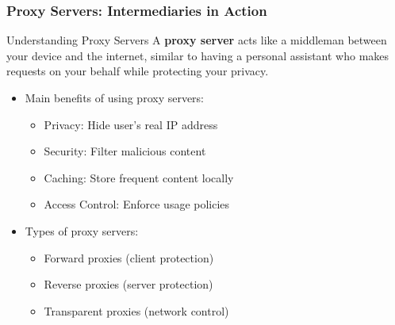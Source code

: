 \documentclass{beamer}
\begin{document}
\begin{frame}
    \frametitle{Proxy Servers: Intermediaries in Action}
    
    \begin{block}{Understanding Proxy Servers}
        A \textbf{proxy server} acts like a middleman between your device and the internet, similar to having a personal assistant who makes requests on your behalf while protecting your privacy.
    \end{block}
    
    \begin{itemize}
        \item Main benefits of using proxy servers:
        \begin{itemize}
            \item Privacy: Hide user's real IP address
            \item Security: Filter malicious content
            \item Caching: Store frequent content locally
            \item Access Control: Enforce usage policies
        \end{itemize}
        
        \item Types of proxy servers:
        \begin{itemize}
            \item Forward proxies (client protection)
            \item Reverse proxies (server protection)
            \item Transparent proxies (network control)
        \end{itemize}
    \end{itemize}
\end{frame}
\end{document}
